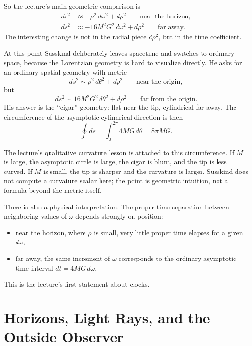 So the lecture's main geometric comparison is
\begin{align}
ds^2 &\approx -\rho^2\,d\omega^2 + d\rho^2
\qquad \text{near the horizon},\\
ds^2 &\approx -16M^2G^2\,d\omega^2 + d\rho^2
\qquad \text{far away}.
\end{align}
The interesting change is not in the radial piece \(d\rho^2\), but in the time coefficient.

At this point Susskind deliberately leaves spacetime and switches to ordinary space, because the Lorentzian geometry is hard to visualize directly. He asks for an ordinary spatial geometry with metric
\begin{equation}
ds^2 \sim \rho^2\,d\theta^2 + d\rho^2
\qquad \text{near the origin},
\end{equation}
but
\begin{equation}
ds^2 \sim 16M^2G^2\,d\theta^2 + d\rho^2
\qquad \text{far from the origin}.
\end{equation}
His answer is the ``cigar'' geometry: flat near the tip, cylindrical far away. The circumference of the asymptotic cylindrical direction is then
\begin{equation}
\oint ds = \int_0^{2\pi} 4MG\,d\theta = 8\pi MG.
\end{equation}

The lecture's qualitative curvature lesson is attached to this circumference. If \(M\) is large, the asymptotic circle is large, the cigar is blunt, and the tip is less curved. If \(M\) is small, the tip is sharper and the curvature is larger. Susskind does not compute a curvature scalar here; the point is geometric intuition, not a formula beyond the metric itself.

There is also a physical interpretation. The proper-time separation between neighboring values of \(\omega\) depends strongly on position:
\begin{itemize}
\item near the horizon, where \(\rho\) is small, very little proper time elapses for a given \(d\omega\),
\item far away, the same increment of \(\omega\) corresponds to the ordinary asymptotic time interval \(dt=4MG\,d\omega\).
\end{itemize}
This is the lecture's first statement about clocks.

\section{Horizons, Light Rays, and the Outside Observer}


